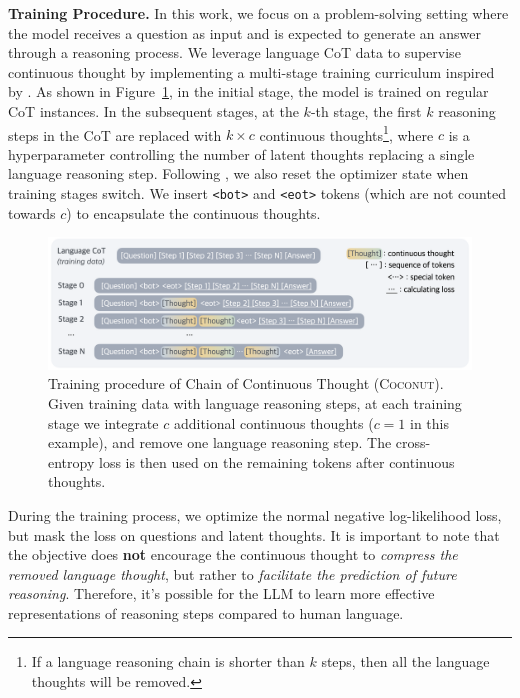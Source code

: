 \documentclass[]{fairmeta}
\newcommand{\ours}{\textsc{Coconut}\xspace}
\begin{document}
\noindent\textbf{Training Procedure.} 
In this work, we focus on a problem-solving setting where the model receives a question as input and is expected to generate an answer through a reasoning process. We leverage language CoT data to supervise continuous thought by implementing a multi-stage training curriculum inspired by \citet{deng2024explicit}. As shown in Figure~\ref{fig:training}, in the initial stage, the model is trained on regular CoT instances. In the subsequent stages, at the $k$-th stage, the first $k$ reasoning steps in the CoT are replaced with $k \times c$ continuous thoughts\footnote{If a language reasoning chain is shorter than $k$ steps, then all the language thoughts will be removed.}, where $c$ is a hyperparameter controlling the number of latent thoughts replacing a single language reasoning step. Following \citet{deng2024explicit}, we also reset the optimizer state when training stages switch. We insert \texttt{<bot>} and \texttt{<eot>} tokens (which are not counted towards $c$) to encapsulate the continuous thoughts.


\begin{figure}
    \vspace{-10pt}
    \centering
    \includegraphics[width=\linewidth]{figures/figure_2_meta_5.png}
    \caption{Training procedure of Chain of Continuous Thought (\ours). 
    Given training data with language reasoning steps, at each training stage we integrate $c$ additional continuous thoughts ($c=1$ in this example), and remove one language reasoning step. The cross-entropy loss is then used on the remaining tokens after continuous thoughts.}
    \label{fig:training}
\end{figure}

During the training process, we optimize the normal negative log-likelihood loss, but mask the loss on questions and latent thoughts. It is important to note that the objective does \textbf{not} encourage the continuous thought to \textit{compress the removed language thought}, but rather to \textit{facilitate the prediction of future reasoning}. Therefore, it's possible for the LLM to learn more effective representations of reasoning steps compared to human language. 
\end{document}
